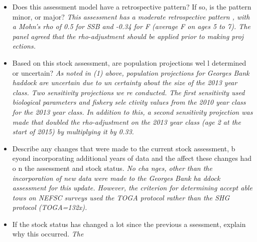 {\begin{itemize}{}
{ of data. It remains uncertain if the scalar applied to all age classes (based 
on Mohn's rho for SSB) is sufficient to account for future revisions to the 201
3 year class estimate. In addition, the median recruitment in the projections (
the proxy for recruitment at MSY) is 53.4 million, which is greater than 7 of t
he last 10 recruitments even though SSB is above the SSBMSY proxy (Table 1). Wh
ile projections of catch and SSB in the near-term are mostly driven by the 2013
 year class, it is worth noting the magnitude of median projected recruitment r
elative to recent recruitment observations.} \item{}Does this assessment model 
have a retrospective pattern? If so, is the pattern minor, or major? \linebreak
{} \hspace*{0.5cm} \textit{This assessment has a moderate retrospective pattern
, with a Mohn's rho of 0.5 for SSB and -0.34 for F (average F on ages 5 to 7). 
The panel agreed that the rho-adjustment should be applied prior to making proj
ections.} \item{}Based on this stock assessment, are population projections wel
l determined or uncertain? \linebreak{} \hspace*{0.5cm} \textit{As noted in (1)
 above, population projections for Georges Bank haddock are uncertain due to un
certainty about the size of the 2013 year class. Two sensitivity projections we
re conducted. The first sensitivity used biological parameters and fishery sele
ctivity values from the 2010 year class for the 2013 year class. In addition to
 this, a second sensitivity projection was made that doubled the rho-adjustment
 on the 2013 year class (age 2 at the start of 2015) by multiplying it by 0.33.
} \item{}Describe any changes that were made to the current stock assessment, b
eyond incorporating additional years of data and the affect these changes had o
n the assessment and stock status. \linebreak{} \hspace*{0.5cm} \textit{ No cha
nges, other than the incorporation of new data were made to the Georges Bank ha
ddock assessment for this update. However, the criterion for determining accept
able tows on NEFSC surveys used the TOGA protocol rather than the SHG protocol 
(TOGA=132x).} \item{}If the stock status has changed a lot since the previous a
ssessment, explain why this occurred. \linebreak{} \hspace*{0.5cm} \textit{The 
}
\end{itemize}}
